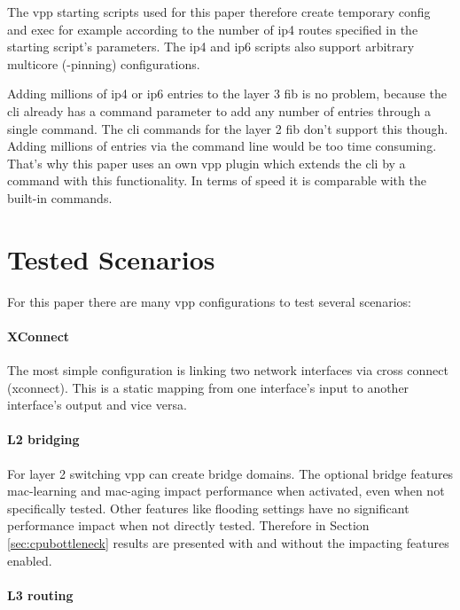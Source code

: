 The \Ac{vpp} starting scripts used for this paper therefore create
temporary \Ac{config} and \Ac{exec} for example according to the
number of \Ac{ip4} routes specified in the starting script's
parameters. The \Ac{ip4} and \Ac{ip6} scripts also support arbitrary
multicore (-pinning) configurations.


Adding millions of \Ac{ip4} or \Ac{ip6} entries to the layer 3
\Ac{fib} is no problem, because the \Ac{cli} already has a command
parameter to add any number of entries through a single command. The
\Ac{cli} commands for the layer 2 \Ac{fib} don't support this though.
Adding millions of entries via the command line would be too time
consuming. That's why this paper uses an own \Ac{vpp} plugin which
extends the \Ac{cli} by a command with this functionality. In terms of
speed it is comparable with the built-in commands.


\section{Tested Scenarios}

For this paper there are many \Ac{vpp} configurations to test several
scenarios:

\paragraph{XConnect} 

The most simple configuration is linking two network interfaces via
cross connect (xconnect). This is a static mapping from one
interface's input to another interface's output and vice versa.

\paragraph{L2 bridging}

For layer 2 switching \Ac{vpp} can create bridge domains. The optional
bridge features mac-learning and mac-aging impact performance when
activated, even when not specifically tested. Other features like
flooding settings have no significant performance impact when not
directly tested. Therefore in Section \ref{sec:cpubottleneck} results
are presented with and without the impacting features enabled.

\paragraph{L3 routing}

